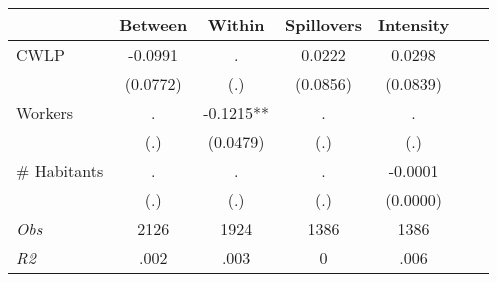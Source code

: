 \begin{tabular}{l*{6}{c}}\hline&\multicolumn{1}{c}{Between}&\multicolumn{1}{c}{Within}&\multicolumn{1}{c}{Spillovers}&\multicolumn{1}{c}{Intensity}\\ \hline 
CWLP & -0.0991 & . & 0.0222 & 0.0298 \\
 & (0.0772) & (.) & (0.0856) & (0.0839) \\
Workers & . & -0.1215** & . & . \\
 & (.) & (0.0479) & (.) & (.) \\
\# Habitants & . & . & . & -0.0001 \\
  & (.) & (.) & (.) & (0.0000) \\
\hline \textit{Obs} & 2126 & 1924 & 1386 & 1386  \\ \textit{R2} & .002 & .003 & 0 & .006 \\ \hline \end{tabular}

